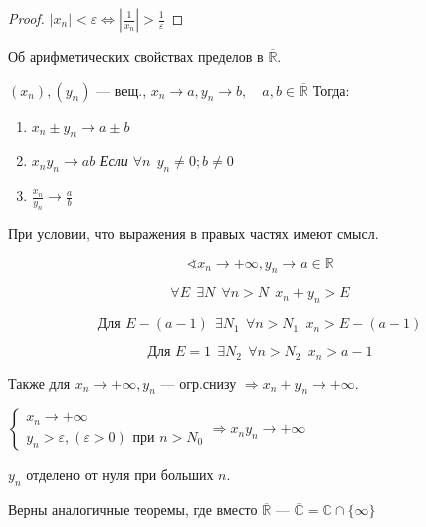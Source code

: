 \begin{proof}
$|x_n|<\varepsilon \Leftrightarrow |\frac{1}{x_n}|>\frac{1}{\varepsilon}$
\end{proof}

\begin{theorem}
Об арифметических свойствах пределов в $\mathbb{\overline R}$.

$(x_n),(y_n)$ --- вещ., $x_n\to a, y_n\to b, \quad a,b\in\mathbb{\overline R}$
Тогда:
\begin{enumerate}
    \item $x_n\pm y_n\to a\pm b$
    \item $x_n y_n\to a b$
    \textit{Если $\forall n \ \ y_n\not=0; b\not=0$}
    \item $\frac{x_n}{y_n}\to\frac{a}{b}$
\end{enumerate}
При условии, что выражения в правых частях имеют смысл.
\end{theorem}

$$\sphericalangle x_n\to +\infty, y_n\to a\in \mathbb{R}$$

$$\forall E \ \ \exists N \ \ \forall n > N \ \ x_n+y_n>E$$

$$\text{Для } E-(a-1) \ \ \exists N_1 \ \ \forall n>N_1 \ \ x_n > E-(a-1)$$

$$\text{Для } E=1 \ \ \exists N_2 \ \ \forall n>N_2 \ \ x_n > a-1$$

Также для $x_n\to+\infty, y_n$ --- огр.снизу $\Rightarrow x_n+y_n\to+\infty$.

$\begin{cases}
    x_n\to+\infty \\
    y_n>\varepsilon, (\varepsilon>0) \text{ при } n>N_0
\end{cases} \Rightarrow x_ny_n\to +\infty$

$y_n$ отделено от нуля при больших $n$.

\begin{remark}
Верны аналогичные теоремы, где вместо $\mathbb{\overline{R}}$ --- $\mathbb{\overline{C}}=\mathbb{C}\cap\{\infty\}$
\end{remark}

